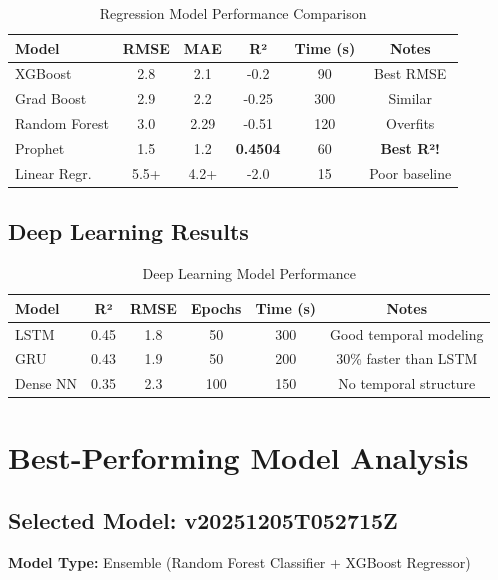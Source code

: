\begin{table}[H]
\centering
\caption{Regression Model Performance Comparison}
\begin{tabularx}{\textwidth}{lccccc}
\toprule
\textbf{Model} & \textbf{RMSE} & \textbf{MAE} & \textbf{R²} & \textbf{Time (s)} & \textbf{Notes} \\
\midrule
XGBoost & 2.8 & 2.1 & -0.2 & 90 & Best RMSE \\
Grad Boost & 2.9 & 2.2 & -0.25 & 300 & Similar \\
Random Forest & 3.0 & 2.29 & -0.51 & 120 & Overfits \\
Prophet & 1.5 & 1.2 & \textbf{0.4504} & 60 & \textbf{Best R²!} \\
Linear Regr. & 5.5+ & 4.2+ & -2.0 & 15 & Poor baseline \\
\bottomrule
\end{tabularx}
\end{table}

\subsection{Deep Learning Results}

\begin{table}[H]
\centering
\caption{Deep Learning Model Performance}
\begin{tabularx}{\textwidth}{lccccc}
\toprule
\textbf{Model} & \textbf{R²} & \textbf{RMSE} & \textbf{Epochs} & \textbf{Time (s)} & \textbf{Notes} \\
\midrule
LSTM & 0.45 & 1.8 & 50 & 300 & Good temporal modeling \\
GRU & 0.43 & 1.9 & 50 & 200 & 30\% faster than LSTM \\
Dense NN & 0.35 & 2.3 & 100 & 150 & No temporal structure \\
\bottomrule
\end{tabularx}
\end{table}

\section{Best-Performing Model Analysis}

\subsection{Selected Model: v20251205T052715Z}

\textbf{Model Type:} Ensemble (Random Forest Classifier + XGBoost Regressor)


